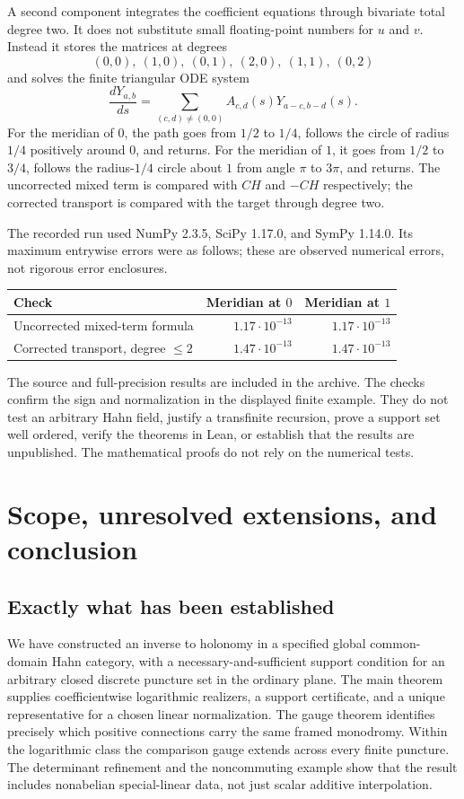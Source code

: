 \documentclass[11pt,letterpaper]{article}
\numberwithin{equation}{section}
\theoremstyle{definition}
\theoremstyle{remark}
\begin{document}
A second component integrates the coefficient equations through bivariate
total degree two. It does not substitute small floating-point numbers for
$u$ and $v$. Instead it stores the matrices at degrees
\[
 (0,0),\ (1,0),\ (0,1),\ (2,0),\ (1,1),\ (0,2)
\]
and solves the finite triangular ODE system
\[
 \frac{dY_{a,b}}{ds}
    =\sum_{(c,d)\ne(0,0)}A_{c,d}(s)Y_{a-c,b-d}(s).
\]
For the meridian of $0$, the path goes from $1/2$ to $1/4$, follows the
circle of radius $1/4$ positively around $0$, and returns. For the meridian
of $1$, it goes from $1/2$ to $3/4$, follows the radius-$1/4$ circle about
$1$ from angle $\pi$ to $3\pi$, and returns.
The uncorrected mixed term is compared with $CH$ and $-CH$ respectively;
the corrected transport is compared with the target through degree two.

The recorded run used NumPy 2.3.5, SciPy 1.17.0, and SymPy 1.14.0. Its
maximum entrywise errors were as follows; these are observed numerical
errors, not rigorous error enclosures.
\begin{center}
\begin{tabular}{lrr}
\toprule
Check & Meridian at $0$ & Meridian at $1$\\
\midrule
Uncorrected mixed-term formula & $1.17\cdot10^{-13}$ & $1.17\cdot10^{-13}$\\
Corrected transport, degree $\leq2$ & $1.47\cdot10^{-13}$ & $1.47\cdot10^{-13}$\\
\bottomrule
\end{tabular}
\end{center}
The source and full-precision results are included in the archive. The
checks confirm the sign and normalization in the displayed finite example.
They do not test an arbitrary Hahn field, justify a transfinite recursion,
prove a support set well ordered, verify the theorems in Lean, or establish
that the results are unpublished. The mathematical proofs do not rely on
the numerical tests.

\section{Scope, unresolved extensions, and conclusion}\label{sec:limits}

\subsection{Exactly what has been established}
We have constructed an inverse to holonomy in a specified global
common-domain Hahn category, with a necessary-and-sufficient support
condition for an arbitrary closed discrete puncture set in the ordinary
plane. The main theorem supplies coefficientwise logarithmic realizers,
a support certificate, and a unique representative for a chosen linear
normalization. The gauge theorem identifies precisely which positive
connections carry the same framed monodromy. Within the logarithmic class
the comparison gauge extends across every finite puncture. The determinant
refinement and the noncommuting example show that the result includes
nonabelian special-linear data, not just scalar additive interpolation.
\end{document}

